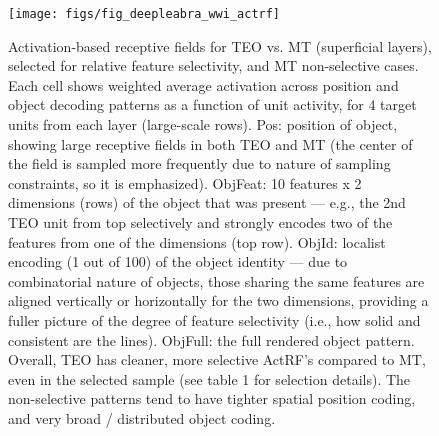 \documentclass[11pt,twoside]{article}
\newif\myifpdf
\begin{document}
\begin{figure}
  \centering\texttt{[image: figs/fig\_deepleabra\_wwi\_actrf]}
  \caption{\footnotesize Activation-based receptive fields for TEO vs. MT (superficial layers), selected for relative feature selectivity, and MT non-selective cases.  Each cell shows weighted average activation across position and object decoding patterns as a function of unit activity, for 4 target units from each layer (large-scale rows).  Pos: position of object, showing large receptive fields in both TEO and MT (the center of the field is sampled more frequently due to nature of sampling constraints, so it is emphasized).  ObjFeat: 10 features x 2 dimensions (rows) of the object that was present --- e.g., the 2nd TEO unit from top selectively and strongly encodes two of the features from one of the dimensions (top row). ObjId: localist encoding (1 out of 100) of the object identity --- due to combinatorial nature of objects, those sharing the same features are aligned vertically or horizontally for the two dimensions, providing a fuller picture of the degree of feature selectivity (i.e., how solid and consistent are the lines).  ObjFull: the full rendered object pattern.  Overall, TEO has cleaner, more selective ActRF's compared to MT, even in the selected sample (see table 1 for selection details).  The non-selective patterns tend to have tighter spatial position coding, and very broad / distributed object coding.}
  \label{fig.actrf}
\end{figure}
\end{document}
